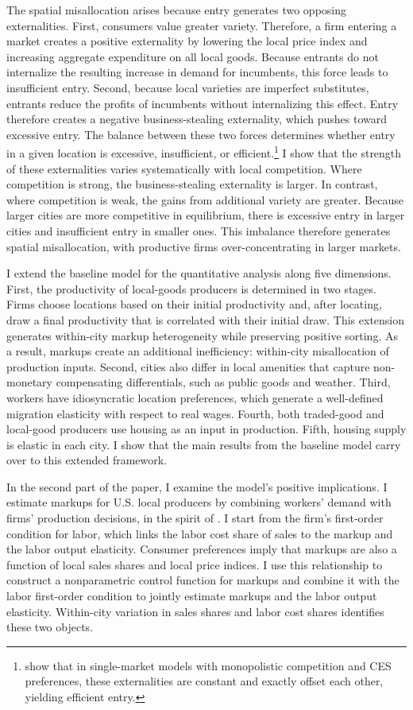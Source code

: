 The spatial misallocation arises because entry generates two opposing externalities. First, consumers value greater variety. Therefore, a firm entering a market creates a positive externality by lowering the local price index and increasing aggregate expenditure on all local goods. Because entrants do not internalize the resulting increase in demand for incumbents, this force leads to insufficient entry. Second, because local varieties are imperfect substitutes, entrants reduce the profits of incumbents without internalizing this effect. Entry therefore creates a negative business-stealing externality, which pushes toward excessive entry. The balance between these two forces determines whether entry in a given location is excessive, insufficient, or efficient.\footnote{\textcite{Dixit&Stiglitz77} show that in single-market models with monopolistic competition and CES preferences, these externalities are constant and exactly offset each other, yielding efficient entry.} I show that the strength of these externalities varies systematically with local competition. Where competition is strong, the business-stealing externality is larger. In contrast, where competition is weak, the gains from additional variety are greater. Because larger cities are more competitive in equilibrium, there is excessive entry in larger cities and insufficient entry in smaller ones. This imbalance therefore generates spatial misallocation, with productive firms over-concentrating in larger markets.

I extend the baseline model for the quantitative analysis along five dimensions. First, the productivity of local-goods producers is determined in two stages. Firms choose locations based on their initial productivity and, after locating, draw a final productivity that is correlated with their initial draw. This extension generates within-city markup heterogeneity while preserving positive sorting. As a result, markups create an additional inefficiency: within-city misallocation of production inputs. Second, cities also differ in local amenities that capture non-monetary compensating differentials, such as public goods and weather. Third, workers have idiosyncratic location preferences, which generate a well-defined migration elasticity with respect to real wages. Fourth, both traded-good and local-good producers use housing as an input in production. Fifth, housing supply is elastic in each city. I show that the main results from the baseline model carry over to this extended framework.

In the second part of the paper, I examine the model’s positive implications. I estimate markups for U.S. local producers by combining workers’ demand with firms’ production decisions, in the spirit of \textcite{DeLoecker11}. I start from the firm’s first-order condition for labor, which links the labor cost share of sales to the markup and the labor output elasticity. Consumer preferences imply that markups are also a function of local sales shares and local price indices. I use this relationship to construct a nonparametric control function for markups and combine it with the labor first-order condition to jointly estimate markups and the labor output elasticity. Within-city variation in sales shares and labor cost shares identifies these two objects.

